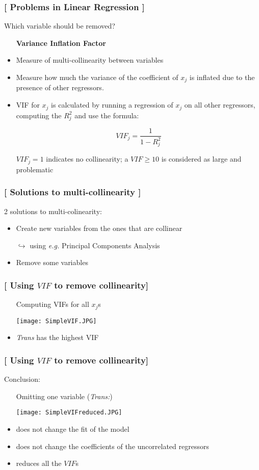 \documentclass[xcolor=x11names,compress, handhouts]{beamer}
\renewcommand{\(}{\begin{columns}}
\renewcommand{\)}{\end{columns}}
\newcommand{\<}[1]{\begin{column}{#1}}
\renewcommand{\>}{\end{column}}
\begin{document}
\begin{frame} %
\frametitle{\textcolor{brique}{[ Problems in Linear Regression ]}}
 Which variable should be removed?
 \pause
\begin{itemize}[<+->]
  \item[] \textbf{Variance Inflation Factor}
  \item Measure of multi-collinearity between variables
  \item Measure how much the variance of the coefficient of $x_j$ is inflated due to the presence of other regressors.
  \item VIF for  $x_j$ is calculated by running a regression of $x_j$ on all other regressors, computing the $R_j^2$ and use the formula:
  \item[] $$
  VIF_j  = \frac{1}{1 - R^2_j}
  $$
  \item[] $VIF_j = 1$ indicates no collinearity; a $VIF \geq 10$  is considered as large and problematic
\end{itemize}
\end{frame}

\begin{frame} %
\frametitle{\textcolor{brique}{[ Solutions to multi-collinearity ]}}
2 solutions to multi-colinearity:
\pause
\begin{itemize}[<+->]
  \item Create new variables from the ones that are collinear
  \item[$\hookrightarrow$] using \textit{e.g.} Principal Components Analysis
  \item Remove some variables
\end{itemize}
\end{frame}


\begin{frame} %
\frametitle{\textcolor{brique}{[ Using $VIF$ to remove collinearity]}}
\pause
\begin{itemize}[<+->]
  \item[]Computing VIFs for all $x_j$s
  \item[] \texttt{[image: SimpleVIF.JPG]} \\
\item  \emph{Trans} has the highest VIF
\end{itemize}
\end{frame}


\begin{frame} %
\frametitle{\textcolor{brique}{[ Using $VIF$ to remove collinearity]}}
Conclusion:
\pause
\begin{itemize}[<+->]
  \item[] Omitting one variable (\textit{Trans:})
  \item[] \texttt{[image: SimpleVIFreduced.JPG]} \\
 \item  does not change the fit of the model
 \item  does not change the coefficients of the uncorrelated regressors
 \item reduces all the $VIF$s
\end{itemize}
\end{frame}
\end{document}
